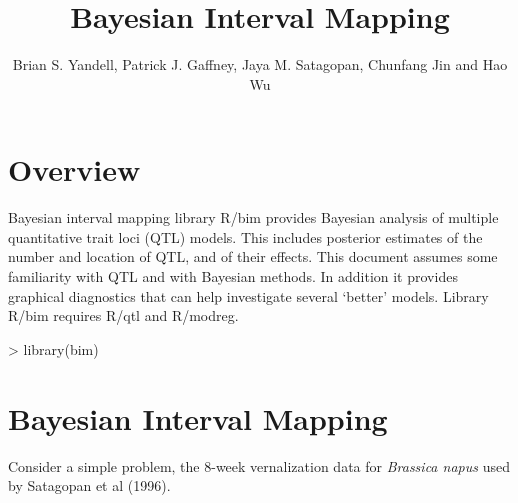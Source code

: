 \documentclass{article}
\begin{document}
\title{Bayesian Interval Mapping}
\author{Brian S. Yandell, Patrick J. Gaffney, Jaya M. Satagopan, Chunfang Jin and Hao Wu} 
\maketitle

\section{Overview}
Bayesian interval mapping library R/bim provides Bayesian analysis of
multiple quantitative trait loci (QTL) models. This includes posterior
estimates of the number and location of QTL, and of their
effects. This document assumes some familiarity with QTL and with
Bayesian methods. In
addition it provides graphical diagnostics that can help investigate
several `better' models. Library R/bim requires R/qtl and R/modreg.

\begin{Schunk}
\begin{Sinput}
> library(bim)
\end{Sinput}
\end{Schunk}

\section{Bayesian Interval Mapping}

Consider a simple problem, the 8-week vernalization data for {\em
Brassica napus}  used by Satagopan et al (1996).
\end{document}
